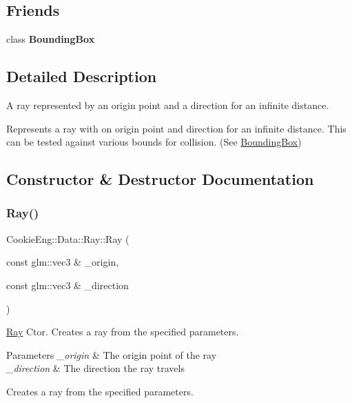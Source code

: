 \subsection*{Friends}
\begin{DoxyCompactItemize}
\item 
\mbox{\label{struct_cookie_eng_1_1_data_1_1_ray_a5f8124438184f87ceb799799fce3ae61}} 
class {\bfseries Bounding\+Box}
\end{DoxyCompactItemize}


\subsection{Detailed Description}
A ray represented by an origin point and a direction for an infinite distance. 

Represents a ray with on origin point and direction for an infinite distance. This can be tested against various bounds for collision. (See \hyperlink{class_cookie_eng_1_1_data_1_1_bounding_box}{Bounding\+Box}) 

\subsection{Constructor \& Destructor Documentation}
\mbox{\label{struct_cookie_eng_1_1_data_1_1_ray_a1e9b2fe1c7b82f3ef7e405dbe8a5f4ee}} 
\subsubsection{\texorpdfstring{Ray()}{Ray()}}
{\footnotesize\ttfamily Cookie\+Eng\+::\+Data\+::\+Ray\+::\+Ray (\begin{DoxyParamCaption}\item[{const glm\+::vec3 \&}]{\+\_\+origin,  }\item[{const glm\+::vec3 \&}]{\+\_\+direction }\end{DoxyParamCaption})}



\hyperlink{struct_cookie_eng_1_1_data_1_1_ray}{Ray} Ctor. Creates a ray from the specified parameters. 


\begin{DoxyParams}{Parameters}
{\em \+\_\+origin} & The origin point of the ray \\
\hline
{\em \+\_\+direction} & The direction the ray travels\\
\hline
\end{DoxyParams}
Creates a ray from the specified parameters. 

